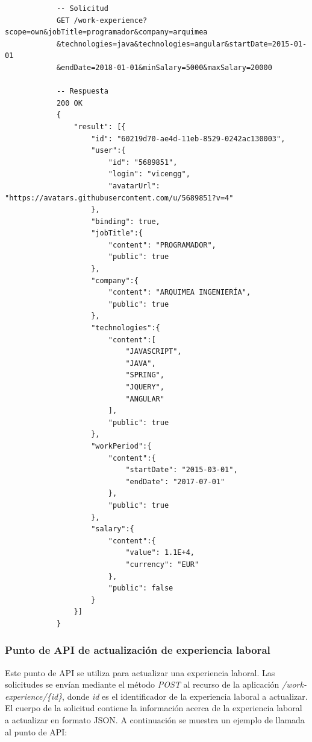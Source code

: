 \documentclass[a4paper, 12pt]{book}
\begin{document}
        {\scriptsize
    \linespread{1}
    \begin{verbatim}
			-- Solicitud
			GET /work-experience?scope=own&jobTitle=programador&company=arquimea
			&technologies=java&technologies=angular&startDate=2015-01-01
			&endDate=2018-01-01&minSalary=5000&maxSalary=20000

			-- Respuesta
			200 OK
			{
			    "result": [{
			        "id": "60219d70-ae4d-11eb-8529-0242ac130003",
			        "user":{
			            "id": "5689851",
			            "login": "vicengg",
			            "avatarUrl": "https://avatars.githubusercontent.com/u/5689851?v=4"
			        },
			        "binding": true,
			        "jobTitle":{
			            "content": "PROGRAMADOR",
			            "public": true
			        },
			        "company":{
			            "content": "ARQUIMEA INGENIERÍA",
			            "public": true
			        },
			        "technologies":{
			            "content":[
			                "JAVASCRIPT",
			                "JAVA",
			                "SPRING",
			                "JQUERY",
			                "ANGULAR"
			            ],
			            "public": true
			        },
			        "workPeriod":{
			            "content":{
			                "startDate": "2015-03-01", 
			                "endDate": "2017-07-01"
			            },
			            "public": true
			        },
			        "salary":{
			            "content":{
			                "value": 1.1E+4, 
			                "currency": "EUR"
			            },
			            "public": false
			        }
			    }]
			}
    \end{verbatim}
    }

    \subsubsection{Punto de API de actualización de experiencia laboral}
    \label{subsec:put_work_experience}
    Este punto de API se utiliza para actualizar una experiencia laboral.
    Las solicitudes se envían mediante el método \emph{POST} al recurso de la aplicación \emph{/work-experience/\{id\}}, donde \emph{id} es el identificador de la experiencia laboral a actualizar.
    El cuerpo de la solicitud contiene la información acerca de la experiencia laboral a actualizar en formato JSON.
    A continuación se muestra un ejemplo de llamada al punto de API:
\end{document}

